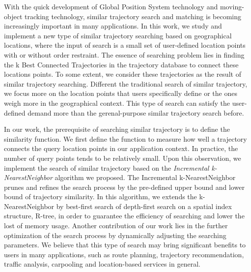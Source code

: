 \begin{englishabstract}
With the quick development of Global Position System technology and moving-object tracking technology, similar trajectory search and matching is becoming increasingly important in many applications. In this work, we study and implement a new type of similar trajectory searching based on geographical locations, where the input of search is a small set of user-defined location points with or without order restraint. The essence of searching problem lies in finding the k Best Connected Trajectories in the trajectory database to connect these locations points. To some extent, we consider these trajectories as the result of similar trajectory searching. Different the traditional search of similar trajectory, we focus more on the location points that users specifically define or the ones weigh more in the geographical context. This type of search can satisfy the user-defined demand more than the gerenal-purpose similar trajectory search before.

In our work, the prerequisite of searching similar trajectory is to define the similarity function. We first define the function to measure how well a trajectory connects the query location points in our application context. In practice, the number of query points tends to be relatively small. Upon this observation, we implement the search of similar trajectory based on the \emph{Incremental k-NearestNeighbor} algorithm we proposed. The Incremental k-NearestNeighbor prunes and refines the search process by the pre-defined upper bound and lower bound of trajectory similarity. In this algorithm, we extends the k-NearestNeighbor by best-first search of depth-first search on a spatial index structure, R-tree, in order to guarantee the efficiency of searching and lower the lost of memory usage. Another contribution of our work lies in the further optimization of the search process by dynamically adjusting the searching parameters. We believe that this type of search may bring significant benefits to users in many applications, such as route planning, trajectory recommendation, traffic analysis, carpooling and location-based services in general.

\end{englishabstract}

